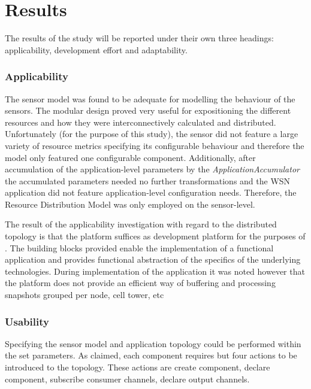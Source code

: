 \section{Results}
The results of the study will be reported under their own three headings: applicability, development effort and adaptability.

\subsubsection{Applicability}
The sensor model was found to be adequate for modelling the behaviour of the \sensit sensors. The modular design proved very useful for expositioning the different resources and how they were interconnectively calculated and distributed. Unfortunately (for the purpose of this study), the sensor did not feature a large variety of resource metrics specifying its configurable behaviour and therefore the model only featured one configurable component. Additionally, after accumulation of the application-level parameters by the \emph{ApplicationAccumulator} the accumulated parameters needed no further transformations and the WSN application did not feature application-level configuration needs. Therefore, the Resource Distribution Model was only employed on the sensor-level.

The result of the applicability investigation with regard to the distributed topology is that the platform suffices as development platform for the purposes of \idsystems. The building blocks provided enable the implementation of a functional application and provides functional abstraction of the specifics of the underlying technologies.  During implementation of the application it was noted however that the platform does not provide an efficient way of buffering and processing snapshots grouped per node, cell tower, etc

\subsubsection{Usability}
Specifying the sensor model and application topology could be performed within the set parameters. As claimed, each component requires but four actions to be introduced to the topology. These actions are create component, declare component, subscribe consumer channels, declare output channels.

